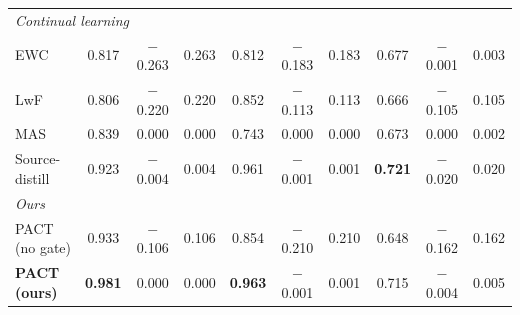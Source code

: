 \begin{table}[t]
\begin{tabular}{l ccc ccc ccc}
\midrule
\multicolumn{10}{l}{\textit{Continual learning}}\\
EWC & 0.817 & $-$0.263 & 0.263 & 0.812 & $-$0.183 & 0.183 & 0.677 & $-$0.001 & 0.003\\
LwF & 0.806 & $-$0.220 & 0.220 & 0.852 & $-$0.113 & 0.113 & 0.666 & $-$0.105 & 0.105\\
MAS & 0.839 & 0.000 & 0.000 & 0.743 & 0.000 & 0.000 & 0.673 & 0.000 & 0.002\\
Source-distill & 0.923 & $-$0.004 & 0.004 & 0.961 & $-$0.001 & 0.001 & \textbf{0.721} & $-$0.020 & 0.020\\
\midrule
\multicolumn{10}{l}{\textit{Ours}}\\
PACT (no gate) & 0.933 & $-$0.106 & 0.106 & 0.854 & $-$0.210 & 0.210 & 0.648 & $-$0.162 & 0.162\\
\textbf{PACT (ours)} & \textbf{0.981} & 0.000 & 0.000 & \textbf{0.963} & $-$0.001 & 0.001 & 0.715 & $-$0.004 & 0.005\\
\bottomrule
\end{tabular}
\end{table}


